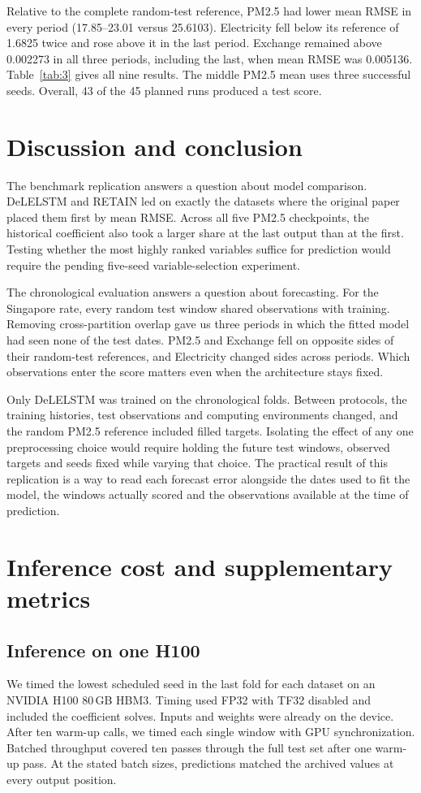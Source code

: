 \documentclass[10pt,a4paper]{article}
\begin{document}
Relative to the complete random-test reference, PM2.5 had lower mean RMSE in every period (17.85--23.01 versus 25.6103). Electricity fell below its reference of 1.6825 twice and rose above it in the last period. Exchange remained above 0.002273 in all three periods, including the last, when mean RMSE was 0.005136. Table~\ref{tab:3} gives all nine results. The middle PM2.5 mean uses three successful seeds. Overall, 43 of the 45 planned runs produced a test score.

\section{Discussion and conclusion}
The benchmark replication answers a question about model comparison. DeLELSTM and RETAIN led on exactly the datasets where the original paper placed them first by mean RMSE. Across all five PM2.5 checkpoints, the historical coefficient also took a larger share at the last output than at the first. Testing whether the most highly ranked variables suffice for prediction would require the pending five-seed variable-selection experiment.

The chronological evaluation answers a question about forecasting. For the Singapore rate, every random test window shared observations with training. Removing cross-partition overlap gave us three periods in which the fitted model had seen none of the test dates. PM2.5 and Exchange fell on opposite sides of their random-test references, and Electricity changed sides across periods. Which observations enter the score matters even when the architecture stays fixed.

Only DeLELSTM was trained on the chronological folds. Between protocols, the training histories, test observations and computing environments changed, and the random PM2.5 reference included filled targets. Isolating the effect of any one preprocessing choice would require holding the future test windows, observed targets and seeds fixed while varying that choice. The practical result of this replication is a way to read each forecast error alongside the dates used to fit the model, the windows actually scored and the observations available at the time of prediction.

\appendix
\section{Inference cost and supplementary metrics}\label{app:metrics}
\subsection{Inference on one H100}
We timed the lowest scheduled seed in the last fold for each dataset on an NVIDIA H100 80\,GB HBM3. Timing used FP32 with TF32 disabled and included the coefficient solves. Inputs and weights were already on the device. After ten warm-up calls, we timed each single window with GPU synchronization. Batched throughput covered ten passes through the full test set after one warm-up pass. At the stated batch sizes, predictions matched the archived values at every output position.
\end{document}
